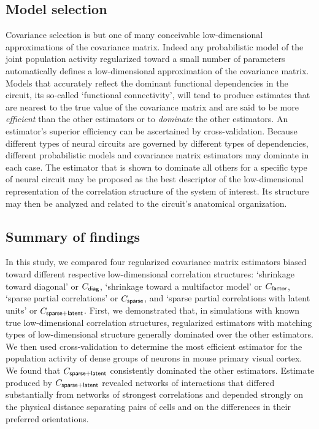 \documentclass[10pt]{article}
\begin{document}
\subsection*{Model selection}
Covariance selection is but one of many conceivable low-dimensional approximations of the covariance matrix. Indeed any probabilistic model of the joint population activity regularized toward a small number of parameters automatically defines a low-dimensional approximation of the covariance matrix. Models that accurately reflect the dominant functional dependencies in the circuit, its so-called `functional connectivity', will tend to produce estimates that are nearest to the true value of the covariance matrix and are said to be more \emph{efficient} than the other estimators or to \emph{dominate} the other estimators. An estimator's superior efficiency can be ascertained by cross-validation.  Because different types of neural circuits are governed by different types of dependencies, different probabilistic models and covariance matrix estimators may dominate in each case. The estimator that is shown to dominate all others for a specific type of neural circuit may be proposed as the best descriptor of the low-dimensional representation of the correlation structure of the system of interest. Its structure may then be analyzed and related to the circuit's anatomical organization.  

\subsection*{Summary of findings}
In this study, we compared four regularized covariance matrix estimators biased toward different respective low-dimensional correlation structures: `shrinkage toward diagonal' or $C_{\sf diag}$, `shrinkage toward a multifactor model' or $C_{\sf factor}$, `sparse partial correlations' or $C_{\sf sparse}$, and `sparse partial correlations with latent units' or $C_{\sf sparse+latent}$.  First, we demonstrated that, in simulations with known true low-dimensional correlation structures, regularized estimators with matching types of low-dimensional structure generally dominated over the other estimators. We then used cross-validation to determine the most efficient estimator for the population activity of dense groups of neurons in mouse primary visual cortex. We found that $C_{\sf sparse+latent}$ consistently dominated the other estimators.  Estimate produced by $C_{\sf sparse+latent}$ revealed networks of interactions that differed substantially from networks of strongest correlations and depended strongly on the physical distance separating pairs of cells and on the differences in their preferred orientations. 
\end{document}

